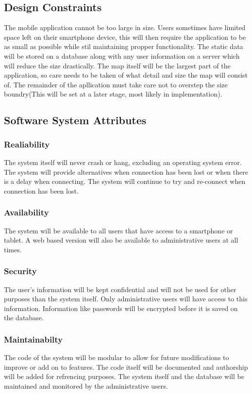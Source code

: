 \documentclass{article}
\begin{document}
	\subsection{Design Constraints}
The mobile application cannot be too large in size. Users sometimes have limited space left on their smartphone device, this will then require the application to be as small as possible while stil maintaining propper functionality. The static data will be stored on a database along with any user information on a server which will reduce the size drastically. The map itself will be the largest part of the application, so care needs to be taken of what detail and size the map will consist of. The remainder of the apllication must take care not to overstep the size boundry(This will be set at a later stage, most likely in implementation). 
	\subsection{Software System Attributes}
		\subsubsection{Realiability}
		The system itself will never crash or hang, excluding an operating system error. The system will provide alternatives when connection has been lost or when there is a delay when connecting. The system will continue to try and re-connect when connection has been lost.
		\subsubsection{Availability}
		The system will be available to all users that have access to a smartphone or tablet. A web based version will also be available to administrative users at all times.
		\subsubsection{Security}
		The user's information will be kept confidential and will not be used for other purposes than the system itself. Only administrative users will have access to this information. Information like passwords will be encrypted before it is saved on the database.
		\subsubsection{Maintainabilty}
		The code of the system will be modular to allow for future modifications to improve or add on to features. The code itself will be documented and authorship will be added for refrencing purposes. The system itself and the database will be maintained and monitored by the administrative users.
\end{document}
